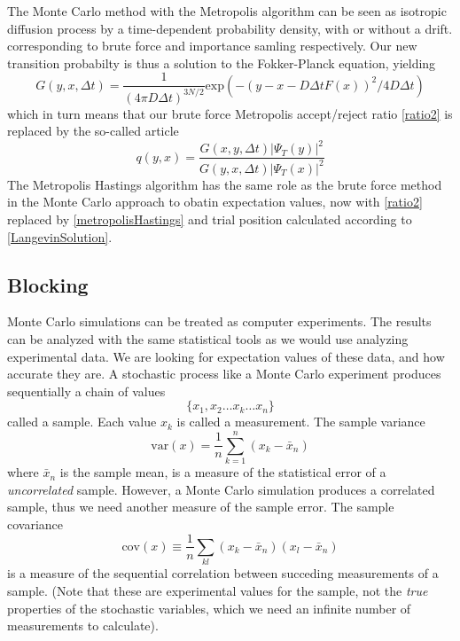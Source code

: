 \documentclass[english, a4paper]{article}
\begin{document}
\noindent The Monte Carlo method with the Metropolis algorithm can be seen as isotropic diffusion process by a time-dependent 
probability density, with or without a drift. corresponding to brute force and importance samling respectively.
Our new transition probabilty is thus a solution to the Fokker-Planck equation, yielding
\begin{equation}
 G(y, x, \Delta t) = \frac{1}{(4\pi D \Delta t)^{3N/2}}
 \textrm{exp}(-(y - x - D\Delta t F(x))^2 / 4D\Delta t)
\end{equation}
which in turn means that our brute force Metropolis accept/reject ratio \eqref{ratio2} is replaced by
the so-called  article
\begin{equation}
 q(y, x) = \frac{G(x, y, \Delta t)|\Psi_T(y)|^2}{G(y, x, \Delta t)|\Psi_T(x)|^2}
 \label{metropolisHastings}
\end{equation}
The Metropolis Hastings algorithm has the same role as the brute force method in the Monte Carlo approach
to obatin expectation values, now with \eqref{ratio2} replaced by \eqref{metropolisHastings} and trial position
calculated according to \eqref{LangevinSolution}.





\subsection{Blocking}

Monte Carlo simulations can be treated as computer experiments. The results can be analyzed with the same
statistical tools as we would use analyzing experimental data. We are looking for expectation values
of these data, and how accurate they are.
A stochastic process like a Monte Carlo experiment produces sequentially a chain of values
\begin{equation}
 \{x_1, x_2 \dots x_k \dots x_n \}
\end{equation}
called a sample. Each value $x_k$ is called a measurement. The sample variance
\begin{equation}
 \textrm{var}(x) = \frac{1}{n} \sum_{k=1}^n (x_k - \bar{x}_n)
 \label{samplevariance}
\end{equation}
where $\bar{x}_n$ is the sample mean, is a measure of the statistical error of a \textit{uncorrelated} sample.
However, a Monte Carlo simulation produces a correlated sample, thus we need another measure of the sample error.
The sample covariance
\begin{equation}
 \textrm{cov}(x) \equiv \frac{1}{n} \sum_{kl} (x_k - \bar{x}_n) (x_l - \bar{x}_n)
\end{equation}
is a measure of the sequential correlation between succeding measurements of a sample.
(Note that these are experimental values for the sample, not the \textit{true} properties of
the stochastic variables, which we need an infinite number of measurements to calculate).\\
\end{document}
